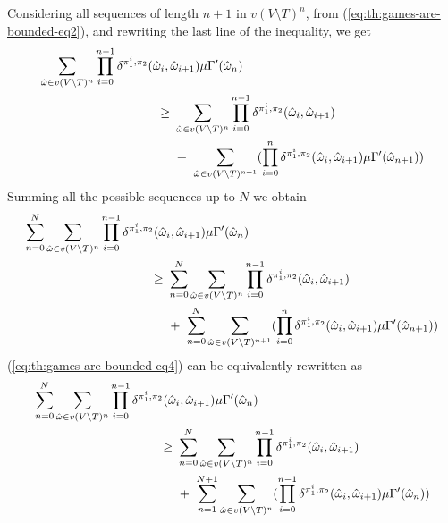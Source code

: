 \begin{myproof}
  Considering all sequences of length $n+1$ in $v(V \setminus T)^n$,
  from (\ref{eq:th:games-are-bounded-eq2}), and rewriting the last
  line of the inequality, we get
  \begin{align}
    \sum_{\hat{\omega} \in v(V \setminus T)^n}\prod^{n-1}_{i=0} \delta^{\strat{1}^i, \strat{2}}(\hat{\omega}_i, \hat{\omega}_{i+1}) \mu \Gamma'(\hat{\omega}_n)  \hspace{-5.5em}& \notag\\
    \geq \ & \sum_{\hat{\omega} \in v(V \setminus T)^n}\prod^{n-1}_{i=0} \delta^{\strat{1}^i, \strat{2}}(\hat{\omega}_i, \hat{\omega}_{i+1}) \label{eq:th:games-are-bounded-eq3}\\
    & + \ \sum_{\hat{\omega} \in v(V \setminus T)^{n+1}}(\prod^{n}_{i=0} \delta^{\strat{1}^i, \strat{2}}(\hat{\omega}_i, \hat{\omega}_{i+1}) \mu \Gamma'(\hat{\omega}_{n+1})) \notag
  \end{align}
  Summing all the possible sequences up to $N$ we obtain
  \begin{align}
    \sum^{N}_{n=0}\sum_{\hat{\omega} \in v(V \setminus T)^n}\prod^{n-1}_{i=0} \delta^{\strat{1}^i, \strat{2}}(\hat{\omega}_i, \hat{\omega}_{i+1}) \mu \Gamma'(\hat{\omega}_n)   \hspace{-6.5em}& \notag\\
    \geq \ & \sum^{N}_{n=0} \sum_{\hat{\omega} \in v(V \setminus T)^n}\prod^{n-1}_{i=0} \delta^{\strat{1}^i, \strat{2}}(\hat{\omega}_i, \hat{\omega}_{i+1}) \label{eq:th:games-are-bounded-eq4} \\
    & + \ \sum^{N}_{n=0} \sum_{\hat{\omega} \in v(V \setminus T)^{n+1}}(\prod^{n}_{i=0} \delta^{\strat{1}^i, \strat{2}}(\hat{\omega}_i, \hat{\omega}_{i+1}) \mu \Gamma'(\hat{\omega}_{n+1})) \notag
  \end{align}
  (\ref{eq:th:games-are-bounded-eq4}) can be equivalently rewritten
  as
  \begin{align}
    \sum^{N}_{n=0}\sum_{\hat{\omega} \in v(V \setminus T)^n}\prod^{n-1}_{i=0} \delta^{\strat{1}^i, \strat{2}}(\hat{\omega}_i, \hat{\omega}_{i+1}) \mu \Gamma'(\hat{\omega}_n)  \hspace{-6.5em}& \notag\\
    \geq \ & \sum^{N}_{n=0} \sum_{\hat{\omega} \in v(V \setminus T)^n}\prod^{n-1}_{i=0} \delta^{\strat{1}^i, \strat{2}}(\hat{\omega}_i, \hat{\omega}_{i+1}) \label{eq:th:games-are-bounded-eq5}\\
    & + \ \sum^{N+1}_{n=1} \sum_{\hat{\omega} \in v(V \setminus T)^{n}}(\prod^{n-1}_{i=0} \delta^{\strat{1}^i, \strat{2}}(\hat{\omega}_i, \hat{\omega}_{i+1}) \mu \Gamma'(\hat{\omega}_{n})) \notag

\end{align}
\end{myproof}
